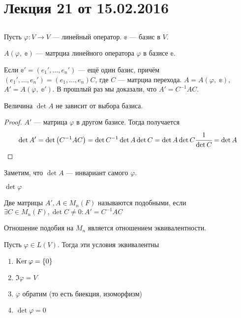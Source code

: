 ﻿



\renewcommand{\phi}{\varphi}

\section{Лекция 21 от 15.02.2016}
\subsection*{}
Пусть $\phi\colon V \rightarrow V$ --- линейный оператор. $\mathbb{e}$ --- базис в $V$. 
\begin{Designation}
    $A(\phi,\;\mathbb{e})$ --- матрциа линейного оператора $\phi$ в базисе $\mathbb{e}$.
\end{Designation}
Если $\mathbb{e}' = (e_1', \ldots, e_n')$ --- ещё один базис, причём $(e_1', \ldots, e_n') = (e_1, \ldots, e_n)C$, где $C$ --- матрциа перехода. $A = A(\phi,\; \mathbb{e})$, $A' = A(\phi,\; \mathbb{e}')$.
В прошлый раз мы доказали, что $A' = C^{-1}AC$.
\begin{Consequence}
    Величина $\det A$ не зависит от выбора базиса. 
\end{Consequence}
\begin{proof}
    $A'$ --- матрица $\phi$ в другом базисе. Тогда получается
    \begin{gather*}
        \det A' = \det \left(C^{-1}AC\right) = \det C^{-1} \det A \det C = \det A \det C \cfrac{1}{\det C} = \det A
    \end{gather*}
\end{proof}
Заметим, что $\det A$ --- инвариант самого $\phi$. 
\begin{Designation}
    $\det\phi$
\end{Designation}
\begin{Def}
    Две матрицы $A', A \in M_n(F)$ называются подобными, если $\exists C \in M_n(F), \det C \neq 0\colon A' = C^{-1}AC$
\end{Def}
\begin{Comment}
    Отношение подобия на $M_n$ является отношением эквивалентности. 
\end{Comment}
\begin{Suggestion}
    Пусть $\phi \in L(V)$. Тогда эти условия эквивалентны
    \begin{enumerate}
        \item $\Ker\phi = \{0\}$
        \item $\Im \phi = V$
        \item $\phi$ обратим (то есть биекция, изоморфизм)
        \item $\det \phi = 0$
    \end{enumerate}
\end{Suggestion}
